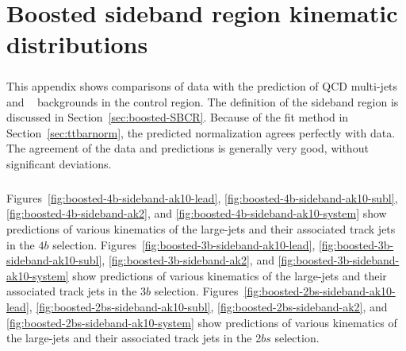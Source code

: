 \chapter{Boosted sideband region kinematic distributions}
\label{AppendixSB}

\paragraph{}
This appendix shows comparisons of data with the prediction of QCD multi-jets and \ttbar~ backgrounds in the control region.  
The definition of the sideband region is discussed in Section~\ref{sec:boosted-SBCR}.
Because of the fit method in Section~\ref{sec:ttbarnorm}, the predicted normalization agrees perfectly with data.
The agreement of the data and predictions is generally very good, without significant deviations.

\paragraph{}
Figures~\ref{fig:boosted-4b-sideband-ak10-lead}, \ref{fig:boosted-4b-sideband-ak10-subl}, \ref{fig:boosted-4b-sideband-ak2},  and \ref{fig:boosted-4b-sideband-ak10-system} show predictions of various kinematics of the large-\R jets and their associated track jets in the $4b$ selection.
Figures~\ref{fig:boosted-3b-sideband-ak10-lead}, \ref{fig:boosted-3b-sideband-ak10-subl}, \ref{fig:boosted-3b-sideband-ak2},  and \ref{fig:boosted-3b-sideband-ak10-system} show predictions of various kinematics of the large-\R jets and their associated track jets in the $3b$ selection.
Figures~\ref{fig:boosted-2bs-sideband-ak10-lead}, \ref{fig:boosted-2bs-sideband-ak10-subl}, \ref{fig:boosted-2bs-sideband-ak2},  and \ref{fig:boosted-2bs-sideband-ak10-system} show predictions of various kinematics of the large-\R jets and their associated track jets in the 2$bs$ selection.


